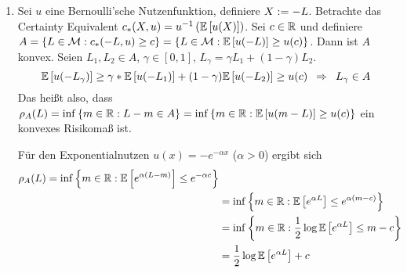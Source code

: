 \begin{beispiel}
	\begin{enumerate}[label=(\alph*)]
		\item Sei $u$ eine Bernoulli'sche Nutzenfunktion, definiere $X \mathrel{:=} -L$. Betrachte das Certainty Equivalent $c_\ast(X,u) = u^{-1}\left( \mathbb{E} \left[ u(X) \right] \right)$. Sei $c \in \mathbb{R}$ und definiere $A = \left\{ L \in \mathcal{M} : c_\ast(-L, u) \ge c \right\} = \left\{ L \in \mathcal{M} : \mathbb{E} \left[ u(-L) \right] \ge u(c) \right\}$. Dann ist $A$ konvex. Seien $L_1, L_2 \in A$, $\gamma \in [0,1]$, $L_\gamma = \gamma L_1 + (1-\gamma) L_2$.
		\begin{equation*}
			\mathbb{E} \left[ u(-L_\gamma) \right] \ge \gamma * \mathbb{E} \left[ u(-L_1) \right] + (1-\gamma) \mathbb{E} \left[ u(-L_2) \right] \ge u(c) \enskip \Rightarrow \enskip L_\gamma \in A
		\end{equation*}
		Das heißt also, dass $\rho_A(L) = \inf\left\{ m \in \mathbb{R} : L-m \in A \right\} = \inf\left\{ m \in \mathbb{R} : \mathbb{E} \left[ u(m-L) \right] \ge u(c) \right\}$ ein konvexes Risikomaß ist.
		
		Für den Exponentialnutzen $u(x) = - e^{-\alpha x}$ ($\alpha > 0$) ergibt sich
		\begin{equation*}
			\begin{aligned}
			\rho_A(L) = \inf\left\{ m \in \mathbb{R} : \mathbb{E} \left[ e^{\alpha (L-m)} \right] \le e^{-\alpha c} \right\} \\
			&= \inf\left\{ m \in \mathbb{R} : \mathbb{E} \left[ e^{\alpha L} \right] \le e^{\alpha (m-c)} \right\} \\
			&= \inf\left\{ m \in \mathbb{R} : \frac{1}{2} \log \mathbb{E} \left[ e^{\alpha L} \right] \le m - c \right\} \\
			&= \frac{1}{2} \log \mathbb{E} \left[ e^{\alpha L} \right] + c
			\end{aligned}
		\end{equation*}
	\end{enumerate}
\end{beispiel}


